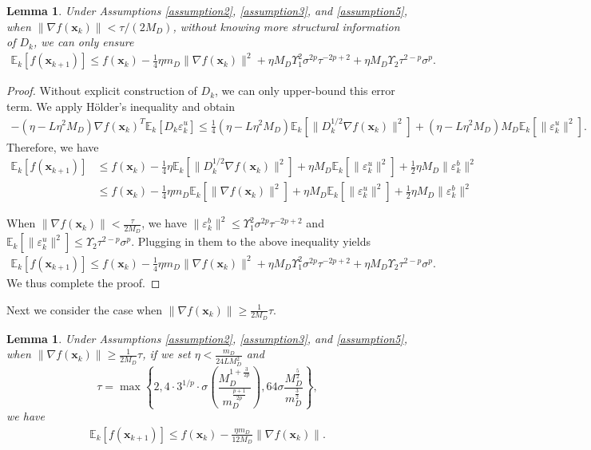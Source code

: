 \documentclass{article}
\newcommand{\bx}{\boldsymbol{x}}
\theoremstyle{plain}
\newtheorem{lemma}[theorem]{Lemma}
\theoremstyle{definition}
\theoremstyle{remark}
\begin{document}
\begin{lemma}
Under Assumptions \ref{assumption2}, \ref{assumption3}, and \ref{assumption5}, when $\|\nabla f(\bx_k)\|<\tau/(2M_D)$, without knowing more structural information of $D_k$, we can only ensure
\begin{align*}
      \mathbb{E}_k[ f(\bx_{k+1}) ] \le f(\bx_k) - \frac{1}{4} \eta m_D \|\nabla f(\bx_k)\|^2 + \eta M_D \Upsilon_1^2 \sigma^{2p}\tau^{-2p+2} +  \eta M_D \Upsilon_2 \tau^{2-p}\sigma^p .
\end{align*}
\end{lemma}
\begin{proof}

Without explicit construction of $D_k$, we can only upper-bound this error term. We apply Hölder's inequality and obtain
\begin{align*}
     - (\eta - L \eta^2 M_D) \nabla f(\bx_k)^T \mathbb{E}_k[ D_k \varepsilon_k^u] \leq \frac{1}{4}(\eta - L \eta^2 M_D) \mathbb{E}_k[\|D_k^{1/2}\nabla f(\bx_k)\|^2]  + (\eta - L \eta^2 M_D) M_D \mathbb{E}_k[ \| \varepsilon_k^u\|^2].
\end{align*}
Therefore, we have
\begin{align*}
    \mathbb{E}_k[ f(\bx_{k+1}) ]  & \le f(\bx_k) - \frac{1}{4} \eta \mathbb{E}_k[ \| D_k^{1/2}\nabla f(\bx_k)\|^2 ] + \eta M_D \mathbb{E}_k[ \| \varepsilon_k^u\|^2]  + \frac{1}{2}\eta M_D  \|\varepsilon_k^b\|^2\\
    & \le f(\bx_k) - \frac{1}{4} \eta m_D \mathbb{E}_k[ \|\nabla f(\bx_k)\|^2 ] + \eta M_D \mathbb{E}_k[ \| \varepsilon_k^u\|^2]  + \frac{1}{2}\eta M_D  \|\varepsilon_k^b\|^2
\end{align*}

When $\|\nabla f(\bx_k)\|<\frac{\tau}{2M_D}$, we have $ \| \varepsilon_k^b\|^2 \leq \Upsilon_1^2\sigma^{2p}\tau^{-2p+2}$ and $\mathbb{E}_k[ \| \varepsilon_k^u\|^2]\leq \Upsilon_2\tau^{2-p}\sigma^p$. Plugging in them to the above inequality yields
\begin{align*}
    \mathbb{E}_k[ f(\bx_{k+1}) ] \le f(\bx_k) - \frac{1}{4} \eta m_D \|\nabla f(\bx_k)\|^2 + \eta M_D \Upsilon_1^2 \sigma^{2p}\tau^{-2p+2} +  \eta M_D \Upsilon_2 \tau^{2-p}\sigma^p .
\end{align*}
We thus complete the proof.
\end{proof}

Next we consider the case when $\|\nabla f(\bx_k)\|\geq \frac{1}{2M_D}\tau$.

\begin{lemma}\label{lemmac8}
    Under Assumptions \ref{assumption2}, \ref{assumption3}, and \ref{assumption5}, when $\|\nabla f(\bx_k)\|\geq \frac{1}{2M_D}\tau$, if we set $\eta<\frac{m_D}{24L M_D^2}$ and 
    \begin{equation*}
       \tau = \max\left\{2,  4\cdot 3^{1/p}\cdot \sigma\left(\frac{M_D^{1+\frac{3}{2p}}}{m_D^{\frac{p+1}{2p}}}\right), 64\sigma\frac{M_D^{\frac{5}{2}}}{m_D^{\frac{3}{2}}}\right\},
    \end{equation*}
    we have
    \begin{align*}
    \mathbb{E}_k[ f(\bx_{k+1}) ] \le f(\bx_k) - \frac{\eta m_D}{12M_D} \|\nabla f(\bx_k)\|.
\end{align*}
\end{lemma}
\end{document}
